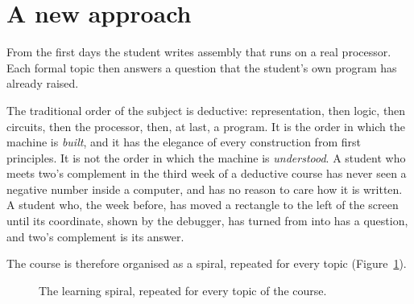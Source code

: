 \section{A new approach}

\begin{prgconcept}
From the first days the student writes \riscv assembly that runs on a real
processor. Each formal topic then answers a question that the student's own
program has already raised.
\end{prgconcept}

The traditional order of the subject is deductive: representation, then logic,
then circuits, then the processor, then, at last, a program. It is the order
in which the machine is \emph{built}, and it has the elegance of every
construction from first principles. It is not the order in which the machine
is \emph{understood}. A student who meets two's complement in the third week
of a deductive course has never seen a negative number inside a computer, and
has no reason to care how it is written. A student who, the week before, has
moved a rectangle to the left of the screen until its coordinate, shown by the
debugger, has turned from  into  has a question,
and two's complement is its answer.

The course is therefore organised as a spiral, repeated for every topic
(Figure~\ref{fig:intro:spiral}).

\begin{figure}[htb]
\centering
{}
\caption{The learning spiral, repeated for every topic of the course.}
\label{fig:intro:spiral}
\end{figure}

